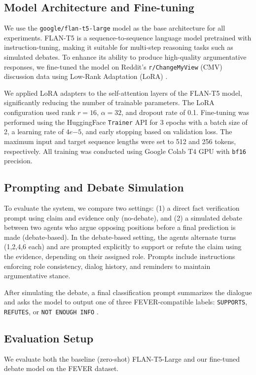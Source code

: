 \documentclass[11pt]{article}
\begin{document}
\subsection{Model Architecture and Fine-tuning}
We use the \texttt{google/flan-t5-large} model \cite{chung2022scaling} as the base architecture for all experiments. FLAN-T5 is a sequence-to-sequence language model pretrained with instruction-tuning, making it suitable for multi-step reasoning tasks such as simulated debates. To enhance its ability to produce high-quality argumentative responses, we fine-tuned the model on Reddit's \texttt{r/ChangeMyView} (CMV) discussion data using Low-Rank Adaptation (LoRA) \cite{hu2021lora}.

We applied LoRA adapters to the self-attention layers of the FLAN-T5 model, significantly reducing the number of trainable parameters. The LoRA configuration used rank $r=16$, $\alpha=32$, and dropout rate of 0.1. Fine-tuning was performed using the HuggingFace \texttt{Trainer} API \cite{wolf2020transformers} for 3 epochs with a batch size of 2, a learning rate of $4e{-5}$, and early stopping based on validation loss. The maximum input and target sequence lengths were set to 512 and 256 tokens, respectively. All training was conducted using Google Colab T4 GPU with \texttt{bf16} precision.

\subsection{Prompting and Debate Simulation}
To evaluate the system, we compare two settings: (1) a direct fact verification prompt using claim and evidence only (no-debate), and (2) a simulated debate between two agents who argue opposing positions before a final prediction is made (debate-based). In the debate-based setting, the agents alternate turns (1,2,4,6 each) and are prompted explicitly to support or refute the claim using the evidence, depending on their assigned role. Prompts include instructions enforcing role consistency, dialog history, and reminders to maintain argumentative stance.

After simulating the debate, a final classification prompt summarizes the dialogue and asks the model to output one of three FEVER-compatible labels: \texttt{SUPPORTS}, \texttt{REFUTES}, or \texttt{NOT ENOUGH INFO} \cite{thorne2018fever}.

\subsection{Evaluation Setup}
We evaluate both the baseline (zero-shot) FLAN-T5-Large and our fine-tuned debate model on the FEVER dataset.
\end{document}
